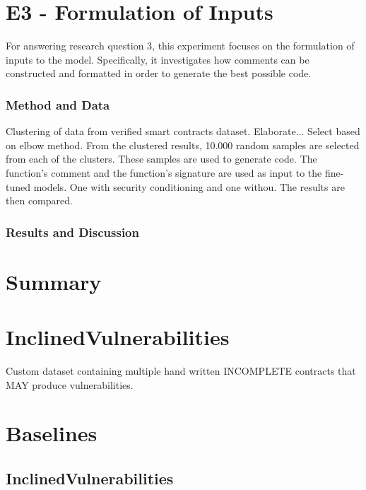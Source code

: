 \section{E3 - Formulation of Inputs}
\label{sec:e3-formulation-of-inputs}
For answering research question 3, this experiment focuses on the formulation of inputs to the model. Specifically, it investigates how comments can be constructed and formatted in order to generate the best possible code.

\subsubsection{Method and Data}
Clustering of data from verified smart contracts dataset. Elaborate... Select based on elbow method. From the clustered results, 10.000 random samples are selected from each of the clusters. These samples are used to generate code. The function's comment and the function's signature are used as input to the fine-tuned models. One with security conditioning and one withou. The results are then compared.

\subsubsection{Results and Discussion}






\section{Summary}






\section{InclinedVulnerabilities}

Custom dataset containing multiple hand written INCOMPLETE contracts that MAY produce vulnerabilities.


\section{Baselines}
\subsection{InclinedVulnerabilities}

